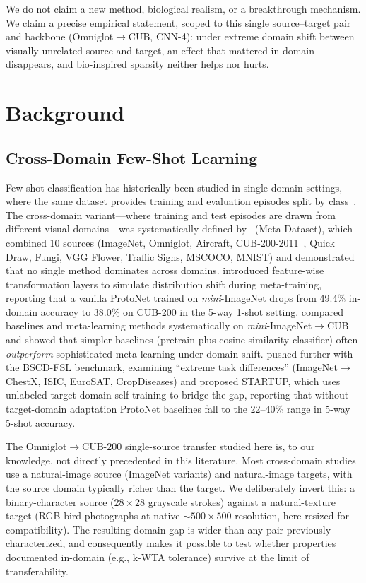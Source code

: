 \documentclass[11pt]{article}
\begin{document}
We do not claim a new method, biological realism, or a breakthrough mechanism. We claim a precise empirical statement, scoped to this single source--target pair and backbone (Omniglot$\to$CUB, CNN-4): under extreme domain shift between visually unrelated source and target, an effect that mattered in-domain disappears, and bio-inspired sparsity neither helps nor hurts.

\section{Background}
\label{sec:background}

\subsection{Cross-Domain Few-Shot Learning}

Few-shot classification has historically been studied in single-domain settings, where the same dataset provides training and evaluation episodes split by class~\citep{lake2015human,vinyals2016matching,snell2017prototypical,finn2017model}. The cross-domain variant---where training and test episodes are drawn from different visual domains---was systematically defined by~\citet{triantafillou2020meta} (Meta-Dataset), which combined 10 sources (ImageNet, Omniglot, Aircraft, CUB-200-2011~\citep{wah2011caltech}, Quick Draw, Fungi, VGG Flower, Traffic Signs, MSCOCO, MNIST) and demonstrated that no single method dominates across domains. \citet{tseng2020cross} introduced feature-wise transformation layers to simulate distribution shift during meta-training, reporting that a vanilla ProtoNet trained on \emph{mini}-ImageNet drops from 49.4\% in-domain accuracy to 38.0\% on CUB-200 in the 5-way 1-shot setting. \citet{chen2019closer} compared baselines and meta-learning methods systematically on \emph{mini}-ImageNet$\to$CUB and showed that simpler baselines (pretrain plus cosine-similarity classifier) often \emph{outperform} sophisticated meta-learning under domain shift. \citet{phoo2021self} pushed further with the BSCD-FSL benchmark, examining ``extreme task differences'' (ImageNet$\to$ChestX, ISIC, EuroSAT, CropDiseases) and proposed STARTUP, which uses unlabeled target-domain self-training to bridge the gap, reporting that without target-domain adaptation ProtoNet baselines fall to the 22--40\% range in 5-way 5-shot accuracy.

The Omniglot$\to$CUB-200 single-source transfer studied here is, to our knowledge, not directly precedented in this literature. Most cross-domain studies use a natural-image source (ImageNet variants) and natural-image targets, with the source domain typically richer than the target. We deliberately invert this: a binary-character source ($28 \times 28$ grayscale strokes) against a natural-texture target (RGB bird photographs at native $\sim 500 \times 500$ resolution, here resized for compatibility). The resulting domain gap is wider than any pair previously characterized, and consequently makes it possible to test whether properties documented in-domain (e.g., k-WTA tolerance) survive at the limit of transferability.
\end{document}
